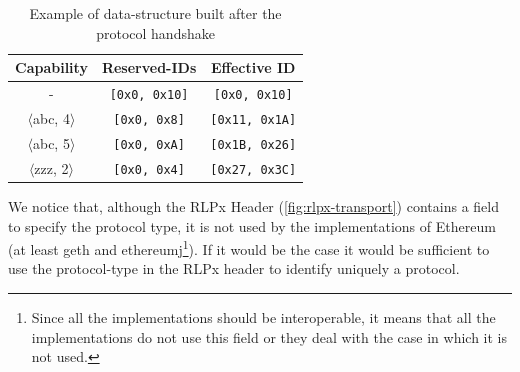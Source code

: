 \begin{table}
  \begin{center}
    \begin{tabular}{c | c | c }
      Capability & Reserved-IDs & Effective ID\\
      \hline
      - & \texttt{[0x0, 0x10]} & \texttt{[0x0, 0x10]} \\
      $\langle$abc, 4$\rangle$ & \texttt{[0x0, 0x8]} & \texttt{[0x11, 0x1A]}  \\
      $\langle$abc, 5$\rangle$ & \texttt{[0x0, 0xA]} & \texttt{[0x1B, 0x26]}  \\
      $\langle$zzz, 2$\rangle$ & \texttt{[0x0, 0x4]}  & \texttt{[0x27, 0x3C]} \\
    \end{tabular}
    \caption{Example of data-structure built after the protocol handshake}
    \label{table:capabilities}
  \end{center}
\end{table}

We notice that, although the RLPx Header (\autoref{fig:rlpx-transport}) contains
a field to specify the protocol type, it is not used by the implementations of
Ethereum (at least geth and ethereumj\footnote{Since all the implementations
should be interoperable, it means that all the implementations do not use this
field or they deal with the case in which it is not used.}). If it would be the
case it would be sufficient to use the protocol-type in the RLPx header to
identify uniquely a protocol.
